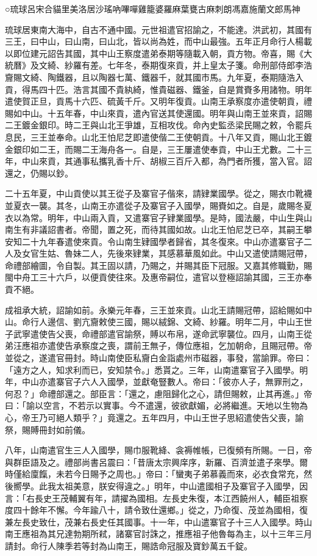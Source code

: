 
\begin{pinyinscope}
○琉球呂宋合貓里美洛居沙瑤吶嗶嘽雞籠婆羅麻葉甕古麻刺朗馮嘉施蘭文郎馬神

琉球居東南大海中，自古不通中國。元世祖遣官招諭之，不能達。洪武初，其國有三王，曰中山，曰山南，曰山北，皆以尚為姓，而中山最強。五年正月命行人楊載以即位建元詔告其國，其中山王察度遣弟泰期等隨載入朝，貢方物。帝喜，賜《大統曆》及文綺、紗羅有差。七年冬，泰期復來貢，并上皇太子箋。命刑部侍郎李浩齎賜文綺、陶鐵器，且以陶器七萬、鐵器千，就其國市馬。九年夏，泰期隨浩入貢，得馬四十匹。浩言其國不貴紈綺，惟貴磁器、鐵釜，自是賞賚多用諸物。明年遣使賀正旦，貢馬十六匹、硫黃千斤。又明年復貢。山南王承察度亦遣使朝貢，禮賜如中山。十五年春，中山來貢，遣內官送其使還國。明年與山南王並來貢，詔賜二王鍍金銀印。時二王與山北王爭雄，互相攻伐。命內史監丞梁民賜之敕，令罷兵息民，三王並奉命。山北王怕尼芝即遣使偕二王使朝貢。十八年又貢，賜山北王鍍金銀印如二王，而賜二王海舟各一。自是，三王屢遣使奉貢，中山王尤數。二十三年，中山來貢，其通事私攜乳香十斤、胡椒三百斤入都，為門者所獲，當入官。詔還之，仍賜以鈔。

二十五年夏，中山貢使以其王從子及寨官子偕來，請肄業國學。從之，賜衣巾靴襪並夏衣一襲。其冬，山南王亦遣從子及寨官子入國學，賜賚如之。自是，歲賜冬夏衣以為常。明年，中山兩入貢，又遣寨官子肄業國學。是時，國法嚴，中山生與山南生有非議詔書者。帝聞，置之死，而待其國如故。山北王怕尼芝已卒，其嗣王攀安知二十九年春遣使來貢。令山南生肄國學者歸省，其冬復來。中山亦遣寨官子二人及女官生姑、魯妹二人，先後來肄業，其感慕華風如此。中山又遣使請賜冠帶，命禮部繪圖，令自製。其王固以請，乃賜之，并賜其臣下冠服。又嘉其修職勤，賜閩中舟工三十六戶，以便貢使往來。及惠帝嗣位，遣官以登極詔諭其國，三王亦奉貢不絕。

成祖承大統，詔諭如前。永樂元年春，三王並來貢。山北王請賜冠帶，詔給賜如中山。命行人邊信、劉亢齎敕使三國，賜以絨錦、文綺、紗羅。明年二月，中山王世子武寧遣使告父喪，命禮部遣官諭祭，賻以布帛，遂命武寧襲位。四月，山南王從弟汪應祖亦遣使告承察度之喪，謂前王無子，傳位應祖，乞加朝命，且賜冠帶。帝並從之，遂遣官冊封。時山南使臣私齎白金詣處州市磁器，事發，當諭罪。帝曰：「遠方之人，知求利而已，安知禁令。」悉貰之。三年，山南遣寨官子入國學。明年，中山亦遣寨官子六人入國學，並獻奄豎數人。帝曰：「彼亦人子，無罪刑之，何忍？」命禮部還之。部臣言：「還之，慮阻歸化之心，請但賜敕，止其再進。」帝曰：「諭以空言，不若示以實事。今不遣還，彼欲獻媚，必將繼進。天地以生物為心，帝王乃可絕人類乎？」竟還之。五年四月，中山王世子思紹遣使告父喪，諭祭，賜賻冊封如前儀。

八年，山南遣官生三人入國學，賜巾服靴絳、衾褥帷帳，已復頻有所賜。一日，帝與群臣語及之。禮部尚書呂震曰：「昔唐太宗興庠序，新羅、百濟並遣子來學。爾時僅給廩餼，未若今日賜予之周也。」帝曰：「蠻夷子弟慕義而來，必衣食常充，然後嚮學。此我太祖美意，朕安得違之。」明年，中山遣國相子及寨官子入國學，因言：「右長史王茂輔翼有年，請擢為國相。左長史朱復，本江西饒州人，輔臣祖察度四十餘年不懈。今年踰八十，請令致仕還鄉。」從之，乃命復、茂並為國相，復兼左長史致仕，茂兼右長史任其國事。十一年，中山遣寨官子十三人入國學。時山南王應祖為其兄達勃期所弒，諸寨官討誅之，推應祖子他魯每為主，以十三年三月請封。命行人陳季若等封為山南王，賜誥命冠服及寶鈔萬五千錠。


\end{pinyinscope}
